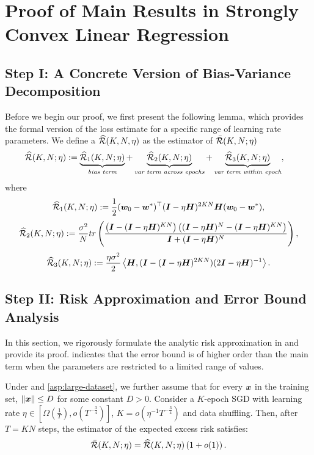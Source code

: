 \section{Proof of Main Results in Strongly Convex Linear Regression}\label{sec:proof-convex}

\subsection{Step I: A Concrete Version of Bias-Variance Decomposition}
Before we begin our proof, we first present the following lemma, which provides the formal version of the loss estimate for a specific range of learning rate parameters. We define a $\widehat{\mathcal{R}}(K,N, \eta)$ as the estimator of $\Bar{\mathcal{R}}(K,N;\eta)$ 
\begin{align*}
    \widehat{\mathcal{R}}(K,N;\eta)&:= \underbrace{\widehat{\mathcal{R}}_1(K,N; \eta)}_{\textit{bias term}} + \underbrace{ \widehat{\mathcal{R}}_2(K,N; \eta)}_{\textit{var term across epochs}} + \underbrace{ \widehat{\mathcal{R}}_3(K,N;\eta)}_{\textit{var term within epoch}},
\end{align*}
where
\begin{align*}
    \widehat{\mathcal{R}}_1(K,N;\eta) := \frac{1}{2}({\bm{w}}_0 - {\bm{w}}^*)^{\top} ({\bm{I}}-\eta{\bm{H}})^{2KN}{\bm{H}} ({\bm{w}}_0 - {\bm{w}}^*),
\end{align*}
\begin{align*}
    \widehat{\mathcal{R}}_2(K,N;\eta) := \frac{\sigma^2}{N} tr\left(\frac{\left({\bm{I}} -({\bm{I}} -\eta{\bm{H}})^{KN}\right)\left(({\bm{I}} -\eta{\bm{H}})^{N} -({\bm{I}} -\eta{\bm{H}})^{KN}\right)}{{\bm{I}} + ({\bm{I}} -\eta{\bm{H}})^N}\right),
\end{align*}
\begin{align*}
    \widehat{\mathcal{R}}_3(K,N;\eta) :=  \frac{\eta\sigma^2}{2}\left\langle {\bm{H}},({\bm{I}} - ({\bm{I}} - \eta {\bm{H}})^{2KN})(2{\bm{I}}-\eta{\bm{H}})^{-1}\right\rangle.
\end{align*}
\subsection{Step II: Risk Approximation and Error Bound Analysis}\label{sec:proof-thm-convex-L-estimate}
In this section, we rigorously formulate the analytic risk approximation in  and provide its proof.  indicates that the error bound is of higher order than the main term when the parameters are restricted to a limited range of values.
\begin{lemma}\label{thm:convex-L-estimate}
    Under  and \ref{asp:large-dataset}, we further assume that for every ${\bm{x}}$ in the training set, $\|{\bm{x}}\| \leq D$ for some constant $D>0$. Consider a $K$-epoch SGD with learning rate $\eta \in \left[\Omega\left(\frac{1}{T}\right), o(T^{-\frac{3}{4}})\right]$, $K = o\left(\eta^{-1} T^{-\frac{3}{4}}\right)$ and data shuffling. Then, after $T = KN$ steps, the estimator of the expected excess risk satisfies:
    \begin{align*}
        \Bar{\mathcal{R}}(K,N;\eta) = \widehat{\mathcal{R}}(K,N; \eta)\left(1+o(1)\right).
    \end{align*}
\end{lemma}

